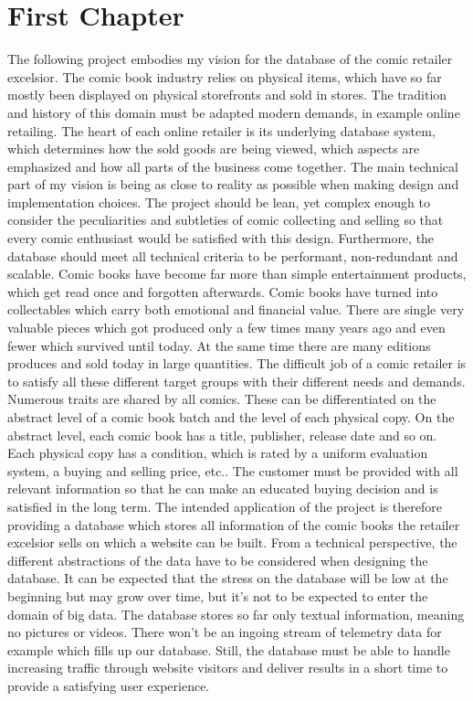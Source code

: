\chapter{First Chapter}
The following project embodies my vision for the database of the comic retailer excelsior. The comic book industry relies on physical items, which have so far mostly been displayed on physical storefronts and sold in stores. The tradition and history of this domain must be adapted modern demands, in example online retailing. The heart of each online retailer is its underlying database system, which determines how the sold goods are being viewed, which aspects are emphasized and how all parts of the business come together. The main technical part of my vision is being as close to reality as possible when making design and implementation choices. The project should be lean, yet complex enough to consider the peculiarities and subtleties of comic collecting and selling so that every comic enthusiast would be satisfied with this design. Furthermore, the database should meet all technical criteria to be performant, non-redundant and scalable.
Comic books have become far more than simple entertainment products, which get read once and forgotten afterwards. Comic books have turned into collectables which carry both emotional and financial value. There are single very valuable pieces which got produced only a few times many years ago and even fewer which survived until today. At the same time there are many editions produces and sold today in large quantities. The difficult job of a comic retailer is to satisfy all these different target groups with their different needs and demands. Numerous traits are shared by all comics. These can be differentiated on the abstract level of a comic book batch and the level of each physical copy. On the abstract level, each comic book has a title, publisher, release date and so on. Each physical copy has a condition, which is rated by a uniform evaluation system, a buying and selling price, etc.. The customer must be provided with all relevant information so that he can make an educated buying decision and is satisfied in the long term. The intended application of the project is therefore providing a database which stores all information of the comic books the retailer excelsior sells on which a website can be built.
From a technical perspective, the different abstractions of the data have to be considered when designing the database. It can be expected that the 	stress on the database will be low at the beginning but may grow over time, but it’s not to be expected to enter the domain of big data. The database stores so far only textual information, meaning no pictures or videos. There won’t be an ingoing stream of telemetry data for example which fills up our database. Still, the database must be able to handle increasing traffic through website visitors and deliver results in a short time to provide a satisfying user experience.
